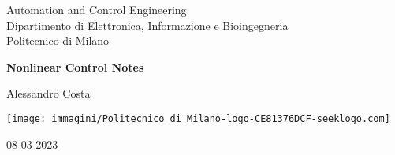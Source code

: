 \documentclass[a4paper]{report}
\theoremstyle{definition}
\theoremstyle{definition}
\begin{document}
	\begin{titlepage}
		\clearpage\thispagestyle{empty}
		\centering
		\vspace{1cm}
		
		{\normalsize Automation and Control Engineering \\ 
			Dipartimento di Elettronica, Informazione e Bioingegneria \\
			Politecnico di Milano \par}
		\vspace{3cm}
		{\Huge \textbf{Nonlinear Control Notes}} \\ 
		\vspace{4cm}
		{\normalsize Alessandro Costa\par}
		\vspace{5cm}
		
\begin{center}
	\texttt{[image: immagini/Politecnico\_di\_Milano-logo-CE81376DCF-seeklogo.com]}
\end{center}
		
		\vspace{0.5cm}
		
	{\normalsize 08-03-2023 \par}		
	\pagebreak
		
	\end{titlepage}
	\tableofcontents
	\pagebreak
	
	\pagebreak
	
	\pagebreak
	
	\pagebreak
	
	\pagebreak
	
	\pagebreak
	
	\pagebreak
	
	\pagebreak
\end{document}
